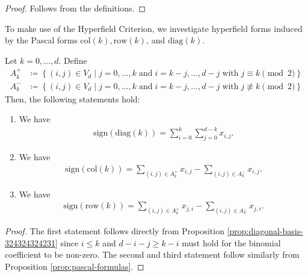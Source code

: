 \begin{proof}
    Follows from the definitions.
\end{proof}

To make use of the Hyperfield Criterion, we investigate hyperfield forms induced by the Pascal forms \( \mathrm{col}(k), \mathrm{row}(k) \), and \( \mathrm{diag}(k) \).

\begin{proposition}\label{skdmldskfmksdej}
    Let \( k = 0, \dots, d \). Define 
    \begin{align*}
        A_k^+ &\coloneqq \left\{ (i,j) \in V_d \mid j = 0, \dots, k \; \text{and} \; i = k-j, \dots, d-j \; \text{with} \; j \equiv k \pmod 2 \right\} \\
        A_k^- &\coloneqq \left\{ (i,j) \in V_d \mid j = 0, \dots, k \; \text{and} \; i = k-j, \dots, d-j \; \text{with} \; j \not \equiv k \pmod 2 \right\}
    \end{align*}
    Then, the following statements hold:
    \begin{enumerate}
        \item We have 
        \begin{align*}
            \mathrm{sign}(\mathrm{diag}(k)) = \sum_{i=0}^k \sum_{j=0}^{d-k} x_{i,j}.
        \end{align*}

        \item We have 
        \begin{align*}
            \mathrm{sign}(\mathrm{col}(k)) = \sum_{(i,j) \in A_k^+} x_{i,j} - \sum_{(i,j) \in A_k^-} x_{i,j}.
        \end{align*}

        \item We have 
        \begin{align*}
            \mathrm{sign}(\mathrm{row}(k)) = \sum_{(i,j) \in A_k^+} x_{j,i} - \sum_{(i,j) \in A_k^-} x_{j,i}.
        \end{align*}
    \end{enumerate}
\end{proposition}

\begin{proof}
    The first statement follows directly from Proposition \ref{prop:diagonal-basis-324324324231} since \( i \leq k \) and \( d - i - j \geq k - i \) must hold for the binomial coefficient to be non-zero. The second and third statement follow similarly from Proposition \ref{prop:pascal-formulas}.
\end{proof}

